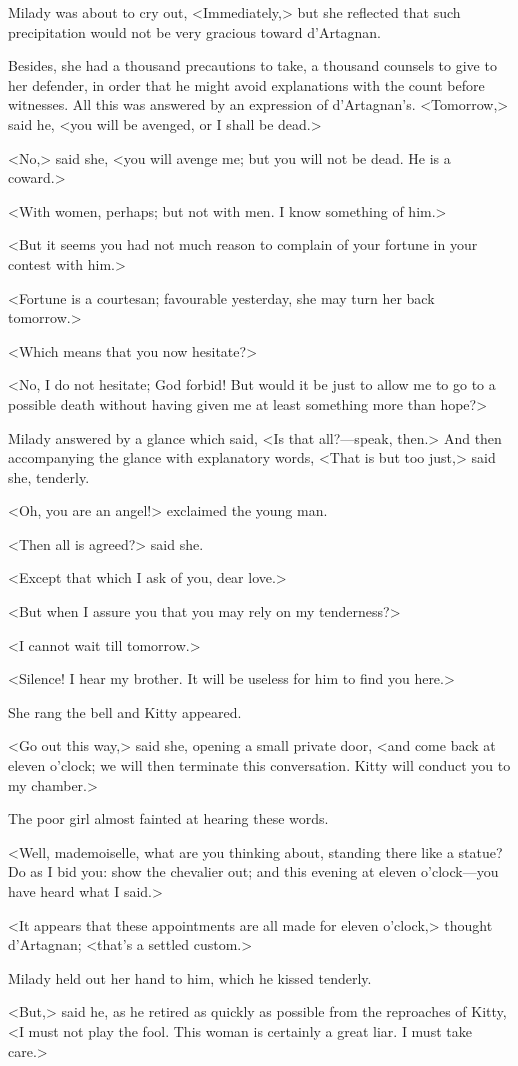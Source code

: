 Milady was about to cry out, <Immediately,> but she reflected that such precipitation would not be very gracious toward d'Artagnan. 

Besides, she had a thousand precautions to take, a thousand counsels to give to her defender, in order that he might avoid explanations with the count before witnesses. All this was answered by an expression of d'Artagnan's. <Tomorrow,> said he, <you will be avenged, or I shall be dead.> 

<No,> said she, <you will avenge me; but you will not be dead. He is a coward.> 

<With women, perhaps; but not with men. I know something of him.> 

<But it seems you had not much reason to complain of your fortune in your contest with him.> 

<Fortune is a courtesan; favourable yesterday, she may turn her back tomorrow.> 

<Which means that you now hesitate?> 

<No, I do not hesitate; God forbid! But would it be just to allow me to go to a possible death without having given me at least something more than hope?> 

Milady answered by a glance which said, <Is that all?---speak, then.> And then accompanying the glance with explanatory words, <That is but too just,> said she, tenderly. 

<Oh, you are an angel!> exclaimed the young man. 

<Then all is agreed?> said she. 

<Except that which I ask of you, dear love.> 

<But when I assure you that you may rely on my tenderness?> 

<I cannot wait till tomorrow.> 

<Silence! I hear my brother. It will be useless for him to find you here.> 

She rang the bell and Kitty appeared. 

<Go out this way,> said she, opening a small private door, <and come back at eleven o'clock; we will then terminate this conversation. Kitty will conduct you to my chamber.> 

The poor girl almost fainted at hearing these words. 

<Well, mademoiselle, what are you thinking about, standing there like a statue? Do as I bid you: show the chevalier out; and this evening at eleven o'clock---you have heard what I said.> 

<It appears that these appointments are all made for eleven o'clock,> thought d'Artagnan; <that's a settled custom.> 

Milady held out her hand to him, which he kissed tenderly. 

<But,> said he, as he retired as quickly as possible from the reproaches of Kitty, <I must not play the fool. This woman is certainly a great liar. I must take care.> 
